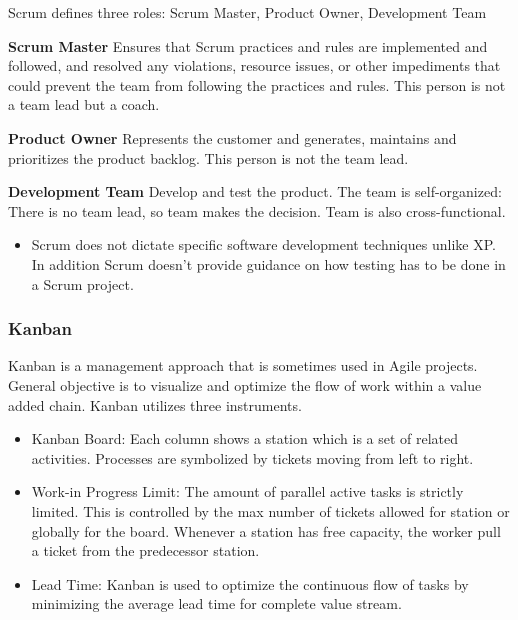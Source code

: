 \documentclass[12pt,a4paper,violet]{bbe}
\begin{document}
Scrum defines three roles: Scrum Master, Product Owner, Development Team
	\begin{definition}
        \textbf{Scrum Master} Ensures that Scrum practices and rules are implemented and followed, and resolved any violations, resource issues, or other impediments that could prevent the team from following the practices and rules. This person is not a team lead but a coach.
	\end{definition}
	
	\begin{definition}
        \textbf{Product Owner} Represents the customer and generates, maintains and prioritizes the product backlog. This person is not the team lead.
	\end{definition}
	
	\begin{definition}
        \textbf{Development Team} Develop and test the product. The team is self-organized: There is no team lead, so team makes the decision. Team is also cross-functional.
	\end{definition}
	
	\begin{remark}
    \begin{itemize}
    \item Scrum does not dictate specific software development techniques unlike XP. In addition Scrum doesn't provide guidance on how testing has to be done in a Scrum project.
    \end{itemize}
    \end{remark}
    
    \subsubsection{Kanban}
    Kanban is a management approach that is sometimes used in Agile projects. General objective is to visualize and optimize the flow of work within a value added chain. Kanban utilizes three instruments.
    \begin{remark}
    \begin{itemize}
    \item Kanban Board: Each column shows a station which is a set of related activities. Processes are symbolized by tickets moving from left to right.
    \item Work-in Progress Limit: The amount of parallel active tasks is strictly limited. This is controlled by the max number of tickets allowed for station or globally for the board. Whenever a station has free capacity, the worker pull a ticket from the predecessor station.
    \item Lead Time: Kanban is used to optimize the continuous flow of tasks by minimizing the average lead time for complete value stream.
    \end{itemize}
    \end{remark}
    
\end{document}
